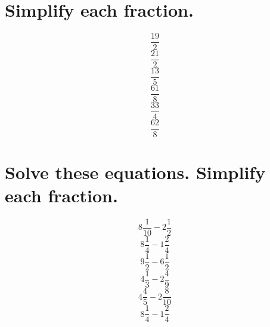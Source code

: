 \documentclass[12pt, fleqn, leqno]{article}
\begin{document}
    \section*{Simplify each fraction.}
\thispagestyle{plain}
        \begin{equation}\frac{19}{2}\end{equation}
        \vspace{4cm}
        \begin{equation}\frac{21}{2}\end{equation}
        \vspace{4cm}
        \begin{equation}\frac{13}{5}\end{equation}
        \vspace{4cm}
        \begin{equation}\frac{61}{8}\end{equation}
        \vspace{4cm}
        \begin{equation}\frac{33}{4}\end{equation}
        \vspace{4cm}
        \begin{equation}\frac{62}{8}\end{equation}
        \vspace{4cm}
\newpage
\section*{Solve these equations. Simplify each fraction.}
\thispagestyle{plain}
        \begin{equation}8\frac{1}{10} - 2\frac{1}{2}\end{equation}
        \vspace{4cm}
        \begin{equation}8\frac{1}{4} - 1\frac{2}{4}\end{equation}
        \vspace{4cm}
        \begin{equation}9\frac{1}{2} - 6\frac{1}{2}\end{equation}
        \vspace{4cm}
        \begin{equation}4\frac{1}{3} - 2\frac{4}{9}\end{equation}
        \vspace{4cm}
        \begin{equation}4\frac{4}{5} - 2\frac{8}{10}\end{equation}
        \vspace{4cm}
        \begin{equation}8\frac{1}{4} - 1\frac{2}{4}\end{equation}
        \vspace{4cm}
\newpage
\end{document}
